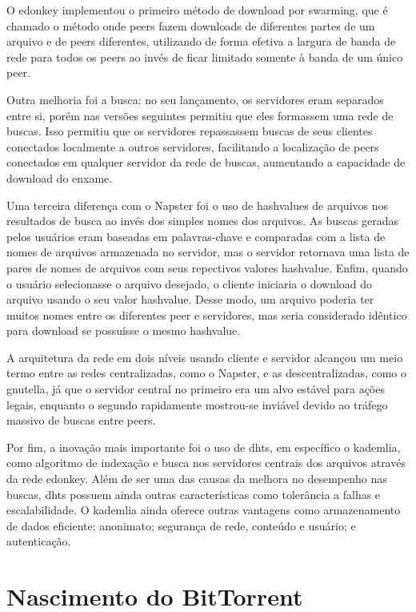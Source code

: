 O \gls*{edonkey} implementou o primeiro método de download por \gls{swarming}, que é
chamado o método onde \glspl*{peer} fazem downloads de diferentes partes de um arquivo e
de \glspl*{peer} diferentes, utilizando de forma efetiva a largura de banda de rede
para todos os \glspl*{peer} ao invés de ficar limitado somente à banda de um único
\gls*{peer}.

Outra melhoria foi a busca: no seu lançamento, os servidores eram separados entre si,
porém nas versões seguintes permitiu que eles formassem uma rede de buscas. Isso
permitiu que os servidores repassassem buscas de seus clientes conectados localmente a
outros servidores, facilitando a localização de \glspl*{peer} conectados em qualquer
servidor da rede de buscas, aumentando a capacidade de download do enxame.

Uma terceira diferença com o Napster foi o uso de \glspl{hashvalue} de arquivos
nos resultados de busca ao invés dos simples nomes dos arquivos. As buscas geradas
pelos usuários eram baseadas em palavras-chave e comparadas com a lista de nomes de
arquivos armazenada no servidor, mas o servidor retornava uma lista de pares de nomes
de arquivos com seus repectivos valores \gls*{hashvalue}. Enfim, quando o usuário
selecionasse o arquivo desejado, o cliente iniciaria o download do arquivo usando o seu
valor \gls*{hashvalue}. Desse modo, um arquivo poderia ter muitos nomes entre os
diferentes \gls*{peer} e servidores, mas seria considerado idêntico para download se
possuísse o mesmo \gls*{hashvalue}.

A arquitetura da rede em dois níveis usando cliente e servidor alcançou um meio termo
entre as redes centralizadas, como o Napster, e as descentralizadas, como o
\gls*{gnutella}, já que o servidor central no primeiro era um alvo estável para ações
legais, enquanto o segundo rapidamente mostrou-se inviável devido ao tráfego massivo de
buscas entre \glspl*{peer}.

Por fim, a inovação mais importante foi o uso de \glspl{dht}, em específico o
\gls{kademlia}, como algoritmo de indexação e busca nos servidores centrais dos
arquivos através da rede \gls*{edonkey}. Além de ser uma das causas da melhora no
desempenho nas buscas, \glspl*{dht} possuem ainda outras características como
tolerância a falhas e escalabilidade. O \gls*{kademlia} ainda oferece
outras vantagens como armazenamento de dados eficiente; anonimato; segurança de rede,
conteúdo e usuário; e autenticação.

\section{Nascimento do BitTorrent}

